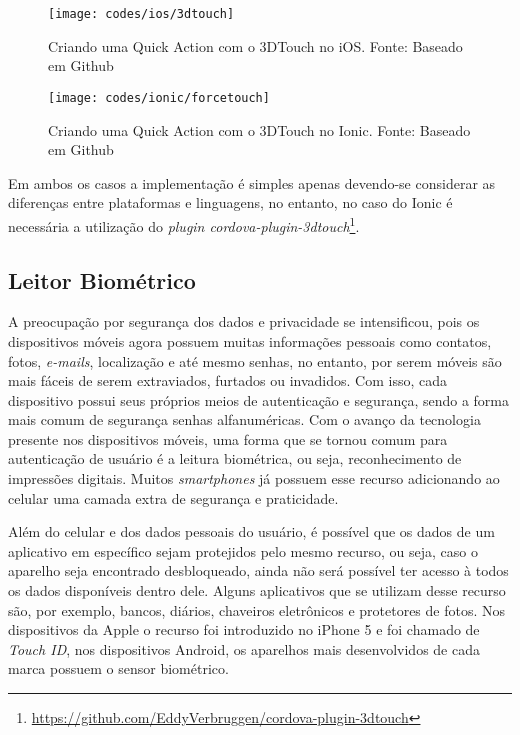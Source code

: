 \begin{figure}[H]
	\centering
	\texttt{[image: codes/ios/3dtouch]}
	\caption[Criando uma Quick Action com o 3DTouch no iOS.]{Criando uma Quick Action com o 3DTouch no iOS. Fonte: Baseado em Github\protect\footnotemark}
	\label{fig:3dtouch-ios}
\end{figure}
\begin{figure}[H]
	\centering
	\texttt{[image: codes/ionic/forcetouch]}
	\caption[Criando uma Quick Action com o 3DTouch no Ionic]{Criando uma Quick Action com o 3DTouch no Ionic. Fonte: Baseado em Github\protect\footnotemark}
	\label{fig:forcetouch-ionic}
\end{figure}

Em ambos os casos a implementação é simples apenas devendo-se considerar as diferenças entre plataformas e linguagens, no entanto, no caso do Ionic é necessária a utilização do 
\textit{plugin cordova-plugin-3dtouch}\footnote{\url{https://github.com/EddyVerbruggen/cordova-plugin-3dtouch}}. 

\subsection{Leitor Biométrico} \label{subsec:biometrico}
A preocupação por segurança dos dados e privacidade se intensificou, pois os dispositivos móveis agora possuem muitas informações pessoais como contatos, fotos, \textit{e-mails}, localização e até mesmo senhas, no entanto,
por serem móveis são mais fáceis de serem extraviados, furtados ou invadidos. Com isso, cada dispositivo possui seus próprios meios de autenticação e segurança, sendo a forma mais comum de segurança senhas alfanuméricas. 
Com o avanço da tecnologia presente nos dispositivos móveis, uma forma que se tornou comum para autenticação de usuário é a leitura biométrica, ou seja, reconhecimento de impressões digitais. Muitos \textit{smartphones} 
já possuem esse recurso adicionando ao celular uma camada extra de segurança e praticidade. 

Além do celular e dos dados pessoais do usuário, é possível que os dados de um aplicativo em específico sejam protejidos pelo mesmo recurso, ou seja, caso o aparelho seja encontrado desbloqueado, ainda não será possível 
ter acesso à todos os dados disponíveis dentro dele. Alguns aplicativos que se utilizam desse recurso são, por exemplo, bancos, diários, chaveiros eletrônicos e protetores de fotos. Nos dispositivos da Apple o recurso 
foi introduzido no iPhone 5 e foi chamado de \textit{Touch ID}, nos dispositivos Android, os aparelhos mais desenvolvidos de cada marca possuem o sensor biométrico. 

